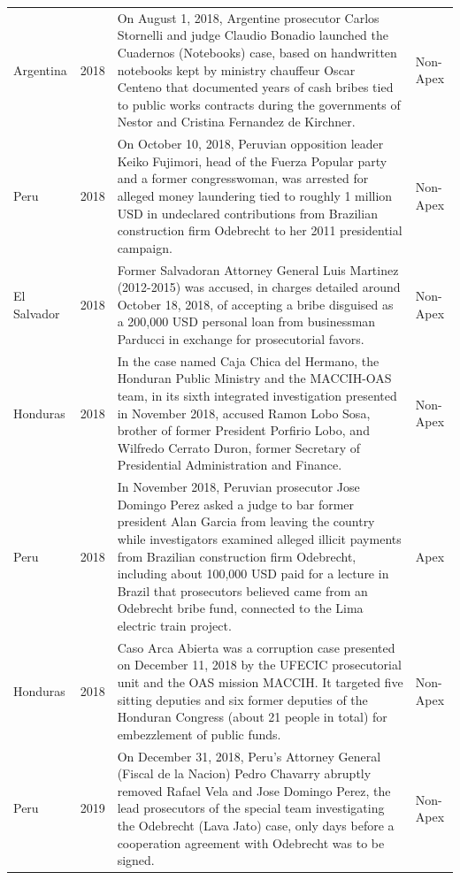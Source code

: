 \begin{landscape}
\begin{longtable}{@{}l c p{15.5cm} l@{}}
Argentina & 2018 & On August 1, 2018, Argentine prosecutor Carlos Stornelli and judge Claudio Bonadio launched the Cuadernos (Notebooks) case, based on handwritten notebooks kept by ministry chauffeur Oscar Centeno that documented years of cash bribes tied to public works contracts during the governments of Nestor and Cristina Fernandez de Kirchner. & Non-Apex \\
Peru & 2018 & On October 10, 2018, Peruvian opposition leader Keiko Fujimori, head of the Fuerza Popular party and a former congresswoman, was arrested for alleged money laundering tied to roughly 1 million USD in undeclared contributions from Brazilian construction firm Odebrecht to her 2011 presidential campaign. & Non-Apex \\
El Salvador & 2018 & Former Salvadoran Attorney General Luis Martinez (2012-2015) was accused, in charges detailed around October 18, 2018, of accepting a bribe disguised as a 200,000 USD personal loan from businessman Parducci in exchange for prosecutorial favors. & Non-Apex \\
Honduras & 2018 & In the case named Caja Chica del Hermano, the Honduran Public Ministry and the MACCIH-OAS team, in its sixth integrated investigation presented in November 2018, accused Ramon Lobo Sosa, brother of former President Porfirio Lobo, and Wilfredo Cerrato Duron, former Secretary of Presidential Administration and Finance. & Non-Apex \\
Peru & 2018 & In November 2018, Peruvian prosecutor Jose Domingo Perez asked a judge to bar former president Alan Garcia from leaving the country while investigators examined alleged illicit payments from Brazilian construction firm Odebrecht, including about 100,000 USD paid for a lecture in Brazil that prosecutors believed came from an Odebrecht bribe fund, connected to the Lima electric train project. & Apex \\
Honduras & 2018 & Caso Arca Abierta was a corruption case presented on December 11, 2018 by the UFECIC prosecutorial unit and the OAS mission MACCIH. It targeted five sitting deputies and six former deputies of the Honduran Congress (about 21 people in total) for embezzlement of public funds. & Non-Apex \\
Peru & 2019 & On December 31, 2018, Peru's Attorney General (Fiscal de la Nacion) Pedro Chavarry abruptly removed Rafael Vela and Jose Domingo Perez, the lead prosecutors of the special team investigating the Odebrecht (Lava Jato) case, only days before a cooperation agreement with Odebrecht was to be signed. & Non-Apex \\

\end{longtable}
\end{landscape}
